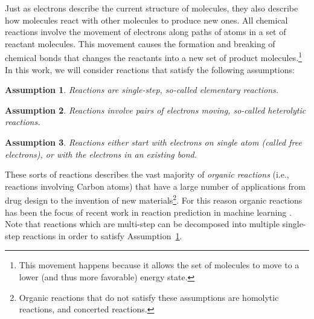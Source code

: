 \documentclass{article}
\newtheorem{assumption}{Assumption}
\begin{document}
Just as electrons describe the current structure of molecules, they also describe how molecules react with other molecules to produce new ones. All chemical reactions involve the movement of electrons along paths of atoms in a set of reactant molecules. This movement causes the formation and breaking of chemical bonds that changes the reactants into a new set of product molecules.\footnote{This movement happens because it allows the set of molecules to move to a lower (and thus more favorable) energy state.} In this work, we will consider reactions that satisfy the following assumptions:
\begin{assumption}
Reactions are single-step, so-called \emph{elementary} reactions.
\label{assume:elem}
\end{assumption}

\begin{assumption}
Reactions involve pairs of electrons moving, so-called \emph{heterolytic} reactions.
\label{assume:het}
\end{assumption}

\begin{assumption}
Reactions either start with electrons on single atom (called \emph{free electrons}), or with the electrons in an existing bond.
\label{assume:atom_bond}
\end{assumption}

These sorts of reactions describes the vast majority of \emph{organic reactions} (i.e., reactions involving Carbon atoms) that have a large number of applications from drug design to the invention of new materials\footnote{Organic reactions that do not satisfy these assumptions are homolytic reactions, and concerted reactions.}. For this reason organic reactions has been the focus of recent work in reaction prediction in machine learning \cite{jin2017predicting,schwaller2017found}. Note that reactions which are multi-step can be decomposed into multiple single-step reactions in order to satisfy Assumption~\ref{assume:elem}.
\end{document}

